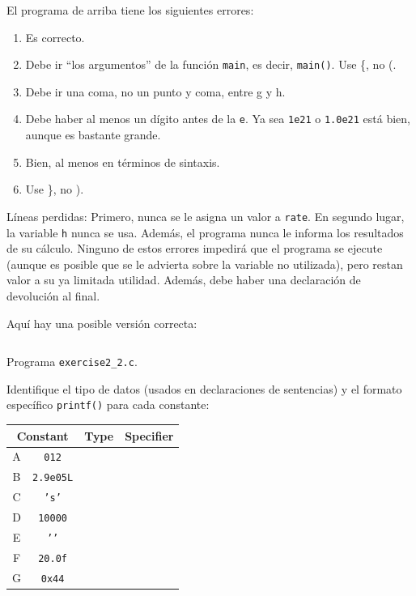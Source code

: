 \documentclass[spanish,addpoints,answers,a4paper]{exam}
\begin{document}
\begin{questions}
\begin{solution}
El programa de arriba tiene los siguientes errores:

\begin{enumerate}[label={Línea \arabic*:},leftmargin=1.2cm]
	\item Es correcto.
	
	\item Debe ir ``los argumentos'' de la función \texttt{main}, es decir, \texttt{main()}. Use \{, no (.

	\item Debe ir una coma, no un punto y coma, entre g y h.
	
	\item Debe haber al menos un dígito antes de la \texttt{e}. Ya sea \texttt{1e21} o \texttt{1.0e21} está bien, aunque es bastante grande.
	
	\item Bien, al menos en términos de sintaxis.
	
	\item Use \}, no ).
\end{enumerate}

Líneas perdidas: Primero, nunca se le asigna un valor a \texttt{rate}. En segundo lugar, la variable \texttt{h} nunca se usa. Además, el programa nunca le informa los resultados de su cálculo. Ninguno de estos errores impedirá que el programa se ejecute (aunque es posible que se le advierta sobre la variable no utilizada), pero restan valor a su ya limitada utilidad. Además, debe haber una declaración de devolución al final.

Aquí hay una posible versión correcta:

\begin{listing}[H]
	\footnotesize
	\inputminted{c}{exercise2_2.c}
	\caption{Programa \texttt{exercise2\_2.c}.}
	\label{lst:2.2}
\end{listing}
\end{solution}

\question Identifique el tipo de datos (usados en declaraciones de sentencias) y el formato específico \texttt{printf()} para cada constante:

\begin{table}[H]
\centering
\begin{tabular}{|c|c|c|c|}
	\hline
	\multicolumn{2}{|c|}{\bfseries Constant} & \textbf{Type} & \textbf{Specifier}	\\
	\hline
	A	&	\texttt{012} 	& 	& 	\\
	\hline
	B 	&	\texttt{2.9e05L}&	&	\\
	\hline
	C	&	\texttt{'s'}	& 	&	\\
	\hline
	D	&	\texttt{10000} 	& 	&	\\
	\hline
	E	&	\texttt{'\n'} 	&	&	\\
	\hline
	F	&	\texttt{20.0f}	&	&	\\
	\hline
	G	&	\texttt{0x44}	&	&	\\
	\hline
\end{tabular}
\end{table}


\end{questions}
\end{document}
